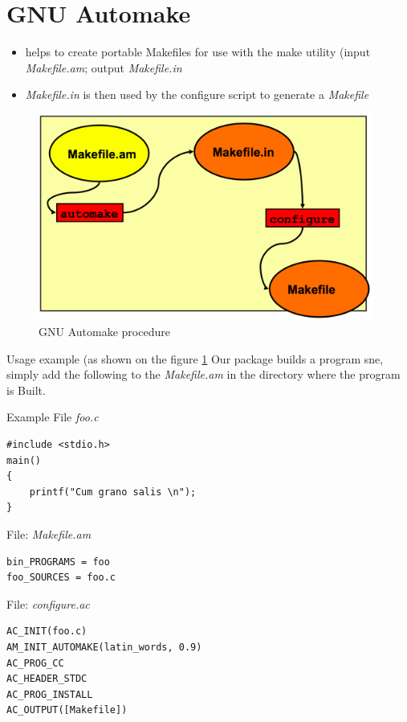 \section{GNU Automake}
\begin{itemize}
	\item helps to create portable Makefiles for use with the make utility (input \textit{Makefile.am}; output \textit{Makefile.in}
	\item \textit{Makefile.in} is then used by the configure script to generate a \textit{Makefile} \cite{automake}
\end{itemize}

\begin{figure}[h!]
    \centering
    \includegraphics[width=11cm]{automake.png}
    \caption{GNU Automake procedure}
    \label{fig:automake}
\end{figure}

Usage example (as shown on the figure \ref{fig:automake}
Our package builds a program sne, simply  add the following to the \textit{Makefile.am} in the directory where the program is Built. 

Example File \textit{foo.c}
\begin{verbatim} 
#include <stdio.h>
main()
{
	printf("Cum grano salis \n");
}
\end{verbatim}

File: \textit{Makefile.am}
\begin{verbatim} 
bin_PROGRAMS = foo
foo_SOURCES = foo.c
\end{verbatim}


File: \textit{configure.ac}
\begin{verbatim} 
AC_INIT(foo.c)
AM_INIT_AUTOMAKE(latin_words, 0.9)
AC_PROG_CC
AC_HEADER_STDC
AC_PROG_INSTALL
AC_OUTPUT([Makefile])
\end{verbatim}

